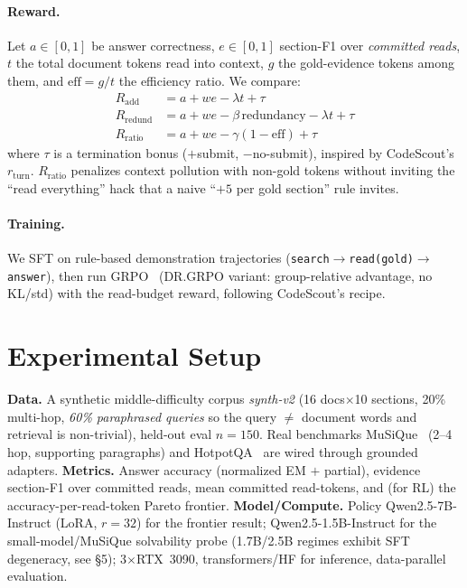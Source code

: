 \documentclass[10pt,twocolumn]{article}
\newcommand{\eff}{\mathrm{eff}}
\begin{document}
\paragraph{Reward.} Let $a\in[0,1]$ be answer correctness, $e\in[0,1]$ section-F1 over \emph{committed reads}, $t$ the total document tokens read into context, $g$ the gold-evidence tokens among them, and $\eff = g/t$ the efficiency ratio. We compare:
\begin{align}
R_{\text{add}} &= a + w e - \lambda t + \tau\\
R_{\text{redund}} &= a + w e - \beta\,\text{redundancy} - \lambda t + \tau\\
R_{\text{ratio}} &= a + w e - \gamma(1-\eff) + \tau
\end{align}
where $\tau$ is a termination bonus ($+$submit, $-$no-submit), inspired by CodeScout's $r_{\text{turn}}$. $R_{\text{ratio}}$ penalizes context pollution with non-gold tokens without inviting the ``read everything'' hack that a naive ``$+5$ per gold section'' rule invites.

\paragraph{Training.} We SFT on rule-based demonstration trajectories (\texttt{search}$\to$\texttt{read(gold)}$\to$\texttt{answer}), then run GRPO~\cite{grpo} (DR.GRPO variant: group-relative advantage, no KL/std) with the read-budget reward, following CodeScout's recipe.

\section{Experimental Setup}
\textbf{Data.} A synthetic middle-difficulty corpus \emph{synth-v2} (16 docs$\times$10 sections, 20\% multi-hop, \emph{60\% paraphrased queries} so the query $\neq$ document words and retrieval is non-trivial), held-out eval $n{=}150$. Real benchmarks MuSiQue~\cite{musique} (2--4 hop, supporting paragraphs) and HotpotQA~\cite{hotpotqa} are wired through grounded adapters. \textbf{Metrics.} Answer accuracy (normalized EM $+$ partial), evidence section-F1 over committed reads, mean committed read-tokens, and (for RL) the accuracy-per-read-token Pareto frontier. \textbf{Model/Compute.} Policy Qwen2.5-7B-Instruct (LoRA, $r{=}32$) for the frontier result; Qwen2.5-1.5B-Instruct for the small-model/MuSiQue solvability probe (1.7B/2.5B regimes exhibit SFT degeneracy, see \S5); 3$\times$RTX~3090, transformers/HF for inference, data-parallel evaluation.
\end{document}
